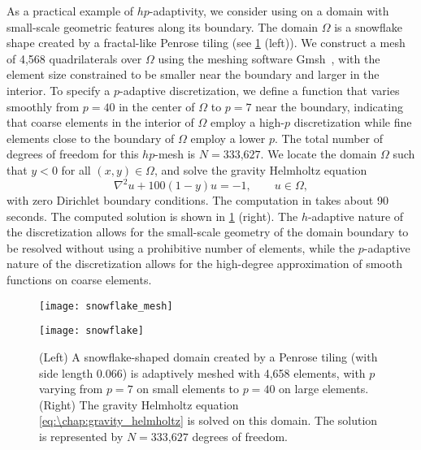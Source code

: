 As a practical example of $hp$-adaptivity, we consider using \ultraSEM on a domain with small-scale geometric features along its boundary. The domain $\Omega$ is a snowflake shape created by a fractal-like Penrose tiling (see \cref{fig:\chap:snowflake} (left)). We construct a mesh of 4,568 quadrilaterals over $\Omega$ using the meshing software Gmsh~\cite{Gmsh}, with the element size constrained to be smaller near the boundary and larger in the interior. To specify a $p$-adaptive discretization, we define a function that varies smoothly from $p=40$ in the center of $\Omega$ to $p=7$ near the boundary, indicating that coarse elements in the interior of $\Omega$ employ a high-$p$ discretization while fine elements close to the boundary of $\Omega$ employ a lower $p$. The total number of degrees of freedom for this $hp$-mesh is $N = \text{333,627}$. We locate the domain $\Omega$ such that $y<0$ for all $(x,y) \in \Omega$, and solve the gravity Helmholtz equation
\begin{equation}\label{eq:\chap:gravity_helmholtz}
\nabla^2 u + 100(1-y)u = -1, \qquad u \in \Omega,
\end{equation}
with zero Dirichlet boundary conditions. The computation in \ultraSEM takes about 90 seconds. The computed solution is shown in \cref{fig:\chap:snowflake} (right). The $h$-adaptive nature of the discretization allows for the small-scale geometry of the domain boundary to be resolved without using a prohibitive number of elements, while the $p$-adaptive nature of the discretization allows for the high-degree approximation of smooth functions on coarse elements.

\begin{figure}[htb]
\centering
    \begin{minipage}{0.49\textwidth}
    \centering
    \texttt{[image: snowflake\_mesh]} \\
    \end{minipage}%
    \begin{minipage}{0.49\textwidth}
    \centering
    \texttt{[image: snowflake]} \\
    \end{minipage}%
\caption{(Left) A snowflake-shaped domain created by a Penrose tiling (with side length 0.066) is adaptively meshed with 4,658 elements, with $p$ varying from $p=7$ on small elements to $p=40$ on large elements. (Right) The gravity Helmholtz equation \cref{eq:\chap:gravity_helmholtz} is solved on this domain. The solution is represented by $N = \text{333,627}$ degrees of freedom.}
\label{fig:\chap:snowflake}
\end{figure}

